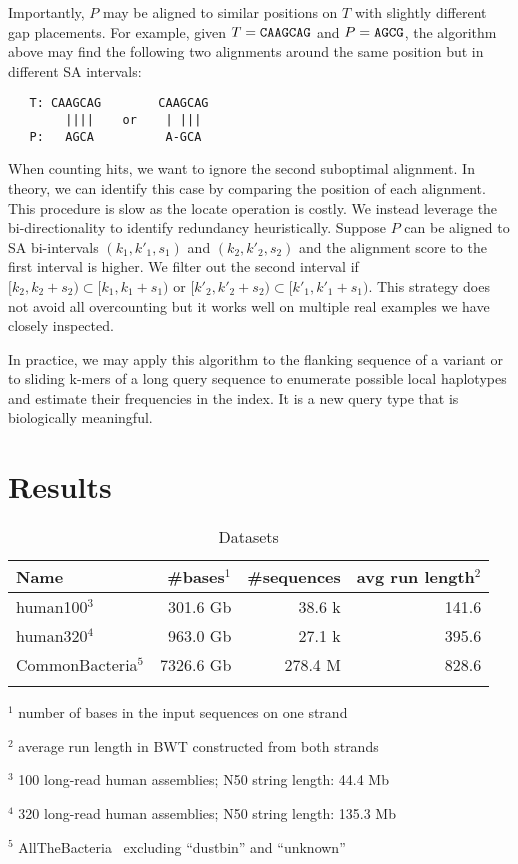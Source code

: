 \documentclass[webpdf,contemporary,large,namedate]{oup-authoring-template}%
\begin{document}
Importantly, $P$ may be aligned to similar positions on $T$ with slightly different gap placements.
For example, given $T={\tt CAAGCAG}$ and $P={\tt AGCG}$,
the algorithm above may find the following two alignments around the same position but in different SA intervals:
\begin{verbatim}
   T: CAAGCAG        CAAGCAG
        ||||    or    | |||
   P:   AGCA          A-GCA
\end{verbatim}
When counting hits, we want to ignore the second suboptimal alignment.
In theory, we can identify this case by comparing the position of each alignment.
This procedure is slow as the locate operation is costly.
We instead leverage the bi-directionality to identify redundancy heuristically.
Suppose $P$ can be aligned to SA bi-intervals $(k_1,k'_1,s_1)$ and $(k_2,k'_2,s_2)$ and the alignment score to the first interval is higher.
We filter out the second interval if $[k_2,k_2+s_2)\subset[k_1,k_1+s_1)$ or $[k'_2,k'_2+s_2)\subset[k'_1,k'_1+s_1)$.
This strategy does not avoid all overcounting but it works well on multiple real examples we have closely inspected.

In practice, we may apply this algorithm to the flanking sequence of a variant
or to sliding k-mers of a long query sequence to enumerate possible local haplotypes and estimate their frequencies in the index.
It is a new query type that is biologically meaningful.

\section{Results}

\begin{table}[!tb]
\caption{Datasets\label{tab:data}}
\begin{tabular*}{\columnwidth}{@{\extracolsep\fill}lrrr@{\extracolsep\fill}}
\toprule
Name               & \#bases$^1$ & \#sequences & avg run length$^2$ \\
\midrule
human100$^3$       &  301.6 Gb &  38.6 k & 141.6 \\
human320$^4$       &  963.0 Gb &  27.1 k & 395.6 \\
CommonBacteria$^5$ & 7326.6 Gb & 278.4 M & 828.6 \\
\botrule
\end{tabular*}
\begin{tablenotes}\setlength\itemsep{0.0em}
\item[$^{1}$] number of bases in the input sequences on one strand
\item[$^{2}$] average run length in BWT constructed from both strands
\item[$^{3}$] 100 long-read human assemblies; N50 string length: 44.4 Mb
\item[$^{4}$] 320 long-read human assemblies; N50 string length: 135.3 Mb
\item[$^{5}$] AllTheBacteria~\citep{Hunt2024.03.08.584059} excluding ``dustbin'' and ``unknown''
\end{tablenotes}
\end{table}
\end{document}
